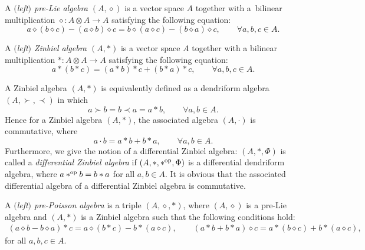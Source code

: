 \documentclass[10pt,a4paper]{amsart}
\numberwithin{equation}{section}
\begin{document}
\begin{Definition}
 A \textit{$($left$)$ pre-Lie algebra $(A,\diamond)$} is a vector space $A$ together with a~bilinear multiplication $\diamond\colon A \otimes A \to A$ satisfying the following equation:
 \begin{equation*}
 a \diamond (b \diamond c) - (a \diamond b) \diamond c = b \diamond (a \diamond c) - (b \diamond a) \diamond c, \qquad \forall a, b, c \in A.
 \end{equation*}
\end{Definition}

\begin{Definition}
 A \textit{$($left$)$ Zinbiel algebra $(A,\ast)$} is a vector space $A$ together with a bilinear multiplication $\ast\colon A \otimes A \to A$ satisfying the following equation:
 \begin{equation*}
 a \ast (b \ast c) = (a \ast b) \ast c + (b \ast a) \ast c, \qquad \forall a, b, c \in A.
 \end{equation*}
\end{Definition}

A Zinbiel algebra $(A, \ast)$ is equivalently defined as a dendriform algebra $(A, \succ, \prec)$ in which
\begin{equation*}
 a \succ b = b \prec a = a \ast b, \qquad \forall a, b \in A.
\end{equation*}
Hence for a Zinbiel algebra $(A, \ast)$, the associated algebra $(A, \cdot)$ is commutative,
where
\begin{equation}
 a \cdot b = a \ast b + b \ast a, \qquad \forall a, b \in A. \label{eq:Zin}
\end{equation}
Furthermore, we give the notion of a differential Zinbiel algebra:
$(A, \ast, \Phi)$ is called a \textit{differential Zinbiel algebra}
if $(A, \ast, \ast^{\rm op}, \Phi)$ is a differential dendriform algebra,
where $a \ast^{\rm op} b = b \ast a$ for all $a, b \in A$.
It is obvious that the associated differential algebra of a differential Zinbiel algebra is commutative.

\begin{Definition}
 A \textit{$($left$)$ pre-Poisson algebra} is a triple $(A, \diamond, \ast)$,
 where $(A, \diamond)$ is a pre-Lie algebra and
 $(A, \ast)$ is a Zinbiel algebra
 such that the following conditions hold:
 \begin{gather*}
 (a \diamond b - b \diamond a) \ast c = a \diamond (b \ast c) - b \ast (a \diamond c), \qquad
 (a \ast b + b \ast a) \diamond c = a \ast (b \diamond c) + b \ast (a \diamond c),
 \end{gather*}
	for all $a, b, c \in A$.
\end{Definition}
\end{document}
